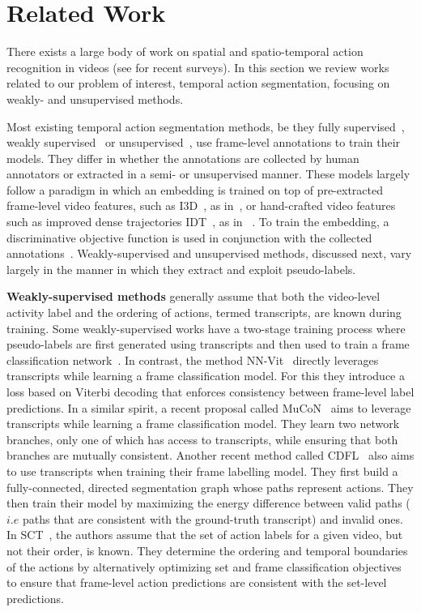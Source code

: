 \documentclass[10pt,twocolumn,letterpaper]{article}
\begin{document}
 \section{Related Work}
There exists a large body of work on spatial and spatio-temporal action recognition in videos (see \cite{herath2017going,asadi2017deep} for recent surveys). In this section we review works related to our problem of interest, temporal action segmentation, focusing on weakly- and unsupervised methods.

Most existing temporal action segmentation methods, be they fully supervised~\cite{ute_6,ute_15,kuehne2018hybrid}, weakly supervised~\cite{mucon,cdfl,nnv,sct} or unsupervised~\cite{ute_paper,mallow,yti_paper}, use frame-level annotations to train their models. They differ in whether the annotations are collected by human annotators or extracted in a semi- or unsupervised manner. 
These models largely follow a paradigm in which an embedding is trained on top of pre-extracted frame-level video features, such as I3D~\cite{i3d}, as in~\cite{mucon,sct}, or hand-crafted video features such as improved dense trajectories IDT~\cite{idt}, as in~ \cite{cdfl,mallow,ute_paper,ute_7,ute_24}.
To train the embedding, a discriminative objective function is used in conjunction with the collected annotations~\cite{cdfl,mallow,ute_7,ute_24,nnv,mucon}. Weakly-supervised and unsupervised methods, discussed next, vary largely in the manner in which they extract and exploit pseudo-labels.
 
\noindent\textbf{Weakly-supervised methods} generally assume that both the video-level activity label and the ordering of actions, termed transcripts, are known during training.
Some weakly-supervised works have a two-stage training process where pseudo-labels are first generated using transcripts and then used to train a frame classification network~\cite{ute_17,ute_24}.
In contrast, the method NN-Vit~\cite{nnv} directly leverages transcripts while learning a frame classification model. For this they introduce a loss based on Viterbi decoding that enforces consistency between frame-level label predictions. In a similar spirit, a recent proposal called MuCoN~\cite{mucon} aims to leverage transcripts while learning a frame classification model. They learn two network branches, only one of which has access to transcripts, while ensuring that both branches are mutually consistent.
Another recent method called CDFL~\cite{cdfl} also aims to use transcripts when training their frame labelling model. They first build a fully-connected, directed segmentation graph whose paths represent actions. They then train their model by maximizing the energy difference between valid paths ($i.e$ paths that are consistent with the ground-truth transcript) and invalid ones. 
In SCT~\cite{sct}, the authors assume that the set of action labels for a given video, but not their order, is known. They determine the ordering and temporal boundaries of the actions by alternatively optimizing set and frame classification objectives to ensure that frame-level action predictions are consistent with the set-level predictions.
\end{document}
